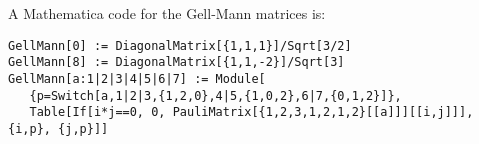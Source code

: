 \documentclass[CheatSheet]{subfiles}
\begin{document}
\clearpage
\detailstyle

A Mathematica code for the Gell-Mann matrices is:
\begin{verbatim}
GellMann[0] := DiagonalMatrix[{1,1,1}]/Sqrt[3/2]
GellMann[8] := DiagonalMatrix[{1,1,-2}]/Sqrt[3]
GellMann[a:1|2|3|4|5|6|7] := Module[
   {p=Switch[a,1|2|3,{1,2,0},4|5,{1,0,2},6|7,{0,1,2}]},
   Table[If[i*j==0, 0, PauliMatrix[{1,2,3,1,2,1,2}[[a]]][[i,j]]], {i,p}, {j,p}]]
\end{verbatim}
\end{document}
